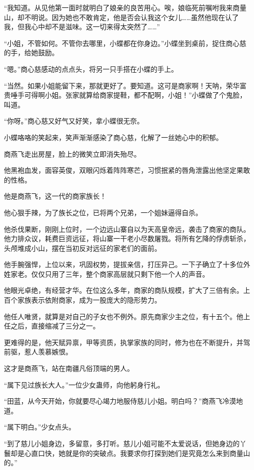 \begin{this_body}
“我知道。从见他第一面时就明白了娘亲的良苦用心。唉，娘临死前嘱咐我来商量山，却不明说。因为她也不敢肯定，他是否会认我这个女儿……虽然他现在认了我，但我心中却不是滋味。这一切来得太突然了……”

“小姐，不管如何。不管你去哪里，小蝶都在你身边。”小蝶坐到桌前，捉住商心慈的手，给她鼓励。

“嗯。”商心慈感动的点点头，将另一只手搭在小蝶的手上。

“当然。如果小姐能留下来，那就更好了。要知道。这可是商家啊！天呐，荣华富贵唾手可得啊小姐。张家就算给商家提鞋，都不配啊，小姐！”小蝶做了个鬼脸，叫道。

“你呀。”商心慈又好气又好笑，拿小蝶很无奈。

小蝶咯咯的笑起来，笑声渐渐感染了商心慈，化解了一丝她心中的积郁。

商燕飞走出房屋，脸上的微笑立即消失殆尽。

他黑袍血发，面容英俊，双眼闪烁着阵阵寒芒，习惯抿紧的唇角泄露出他坚定果敢的性格。

他是商燕飞，这一代的商家族长！

他心狠手辣，为了族长之位，已将两个兄弟，一个姐妹逼得自杀。

他杀伐果断，刚刚上位时，一个边远山寨自以为天高皇帝远，袭击了商家的商队。他力排众议，耗费巨资远征，将山寨一干老小尽数屠戮。将所有乞降的俘虏斩杀，头颅堆成小山，摆在当初反对远征的家老们的面前。

他手腕强悍，上位以来，巩固权势，提拔亲信，打压异己。一下子确立了十多位外姓家老。仅仅只用了三年，整个商家高层就只剩下他一个人的声音。

他眼光卓绝，有经营才华。在位这么多年，商家的商队规模，扩大了三倍有余。上百个家族表示依附商家，成为一股庞大的隐形势力。

他任人唯贤，就算是对自己的子女也不例外。原先商家少主之位，有十五个。他上任之后，直接缩减了三分之一。

更难得的是，他天赋异禀，甲等资质，执掌家族的同时，修为也在不断提升，并驾前驱，惹人羡慕嫉恨。

这才是商燕飞，站在南疆凡俗顶端的男人。

“属下见过族长大人。”一位少女蛊师，向他躬身行礼。

“田蓝，从今天开始，你就要尽心竭力地服侍慈儿小姐。明白吗？”商燕飞冷漠地道。

“属下明白。”少女点头。

“到了慈儿小姐身边，多留意，多打听。慈儿小姐可能不太爱说话，但她身边的丫鬟却是心直口快，她就是你的突破点。我要求你打探到她们是究竟怎么来到商量山的。”


\end{this_body}
